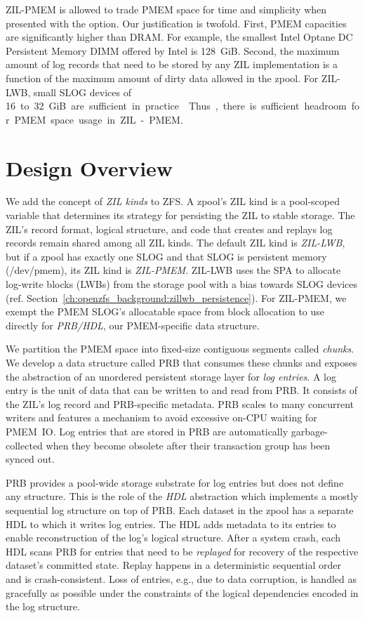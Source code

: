 \documentclass[12pt,a4paper,twoside]{book}
\begin{document}
ZIL-PMEM is allowed to trade PMEM space for time and simplicity when presented with the option.
Our justification is twofold.
First, PMEM capacities are significantly higher than DRAM.
For example, the smallest Intel Optane DC Persistent Memory DIMM offered by Intel is 128~GiB.
Second, the maximum amount of log records that need to be stored by any ZIL implementation is a function of the maximum amount of dirty data allowed in the zpool.
For ZIL-LWB, small SLOG devices of \SI{16} to 32~GiB are sufficient in practice \cite{OpenZFSDocsWorkloadTuningSynchronousIO}.
Thus, there is sufficient headroom for PMEM space usage in ZIL-PMEM.

\section{Design Overview}\label{sec:designoverview}
We add the concept of \textit{ZIL kinds} to ZFS.
A zpool's ZIL kind is a pool-scoped variable that determines its strategy for persisting the ZIL to stable storage.
The ZIL's record format, logical structure, and code that creates and replays log records remain shared among all ZIL kinds.
The default ZIL kind is \textit{ZIL-LWB}, but if a zpool has exactly one SLOG and that SLOG is persistent memory (/dev/pmem), its ZIL kind is \textit{ZIL-PMEM}.
ZIL-LWB uses the SPA to allocate log-write blocks (LWBs) from the storage pool with a bias towards SLOG devices (ref. Section~\ref{ch:openzfs_background:zillwb_persistence}).
For ZIL-PMEM, we exempt the PMEM SLOG's allocatable space from block allocation to use directly for \textit{PRB/HDL}, our PMEM-specific data structure.

We partition the PMEM space into fixed-size contiguous segments called \textit{chunks}.
We develop a data structure called PRB that consumes these chunks and exposes the abstraction of an unordered persistent storage layer for \textit{log entries}.
A log entry is the unit of data that can be written to and read from PRB.
It consists of the ZIL's log record and PRB-specific metadata.
PRB scales to many concurrent writers and features a mechanism to avoid excessive on-CPU waiting for PMEM~IO.
Log entries that are stored in PRB are automatically garbage-collected when they become obsolete after their transaction group has been synced out.

PRB provides a pool-wide storage substrate for log entries but does not define any structure.
This is the role of the \textit{HDL} abstraction which implements a mostly sequential log structure on top of PRB.
Each dataset in the zpool has a separate HDL to which it writes log entries.
The HDL adds metadata to its entries to enable reconstruction of the log's logical structure.
After a system crash, each HDL scans PRB for entries that need to be \textit{replayed} for recovery of the respective dataset's committed state.
Replay happens in a deterministic sequential order and is crash-consistent.
Loss of entries, e.g., due to data corruption, is handled as gracefully as possible under the constraints of the logical dependencies encoded in the log structure.
\end{document}
